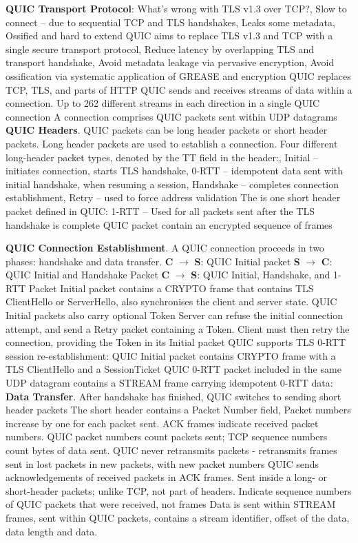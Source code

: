 \documentclass{article}
\begin{document}
\vspace{\baselineskip}
\textbf{QUIC Transport Protocol}:
What’s wrong with TLS v1.3 over TCP?,
Slow to connect – due to sequential TCP and TLS handshakes,
Leaks some metadata,
Ossified and hard to extend
QUIC aims to replace TLS v1.3 and TCP with a single secure transport protocol,
Reduce latency by overlapping TLS and transport handshake,
Avoid metadata leakage via pervasive encryption,
Avoid ossification via systematic application of GREASE and encryption
QUIC replaces TCP, TLS, and parts of HTTP
QUIC sends and receives streams of data within a connection.
Up to 262 different streams in each direction in a single QUIC connection
A connection comprises QUIC packets sent within UDP datagrams
\textbf{QUIC Headers}. QUIC packets can be long header packets or short header packets.
Long header packets are used to establish a connection.
Four different long-header packet types, denoted
by the TT field in the header:,
Initial – initiates connection, starts TLS handshake,
0-RTT – idempotent data sent with initial handshake, when resuming a session,
Handshake – completes connection establishment,
Retry – used to force address validation
The is one short header packet defined in QUIC\@:
1-RTT – Used for all packets sent after the TLS handshake is complete
QUIC packet contain an encrypted sequence of frames

\vspace{\baselineskip}
\textbf{QUIC Connection Establishment}. A QUIC connection proceeds in two phases: handshake and data transfer.
\textbf{C} $\rightarrow$ \textbf{S}: QUIC Initial packet
\textbf{S} $\rightarrow$ \textbf{C}: QUIC Initial and Handshake Packet
\textbf{C} $\rightarrow$ \textbf{S}: QUIC Initial, Handshake, and 1-RTT Packet
Initial packet contains a CRYPTO frame that contains TLS ClientHello or ServerHello, also synchronises the client and server state.
QUIC Initial packets also carry optional Token Server can refuse the initial connection attempt,
and send a Retry packet containing a Token.
Client must then retry the connection, providing the Token in its Initial packet
QUIC supports TLS 0-RTT session re-establishment: QUIC Initial packet contains CRYPTO frame with a TLS ClientHello
and a SessionTicket QUIC 0-RTT packet included in the same UDP datagram contains a STREAM frame carrying idempotent 0-RTT data:
\textbf{Data Transfer}. After handshake has finished, QUIC switches to sending short header packets
The short header contains a Packet Number field, Packet numbers increase by one for each packet sent.
ACK frames indicate received packet numbers. QUIC packet numbers count packets sent; TCP sequence numbers count bytes of data sent.
QUIC never retransmits packets {-} retransmits frames sent in lost packets in new packets, with new packet numbers
QUIC sends acknowledgements of received packets in ACK frames.
Sent inside a long- or short-header packets; unlike TCP, not part of headers.
Indicate sequence numbers of QUIC packets that were received, not frames
Data is sent within STREAM frames, sent within QUIC packets, contains a stream identifier, offset of the data, data length and data.
\end{document}
